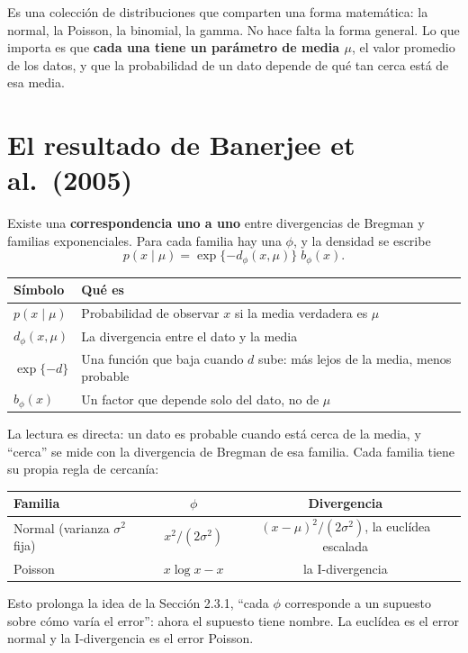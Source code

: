 \documentclass[11pt,a4paper]{article}
\begin{document}
Es una colección de distribuciones que comparten una forma matemática: la normal,
la Poisson, la binomial, la gamma. No hace falta la forma general. Lo que importa
es que \textbf{cada una tiene un parámetro de media $\mu$}, el valor promedio de
los datos, y que la probabilidad de un dato depende de qué tan cerca está de esa
media.

\section{El resultado de Banerjee et al.\ (2005)}

Existe una \textbf{correspondencia uno a uno} entre divergencias de Bregman y
familias exponenciales. Para cada familia hay una $\phi$, y la densidad se escribe
\[
  p(x\mid\mu)=\exp\{-d_\phi(x,\mu)\}\;b_\phi(x).
\]
\begin{center}
\renewcommand{\arraystretch}{1.3}
\begin{tabular}{@{}>{\raggedright\arraybackslash}p{3.2cm}>{\raggedright\arraybackslash}p{10.6cm}@{}}
\toprule
\textbf{Símbolo} & \textbf{Qué es} \\
\midrule
$p(x\mid\mu)$ & Probabilidad de observar $x$ si la media verdadera es $\mu$ \\
\midrule
$d_\phi(x,\mu)$ & La divergencia entre el dato y la media \\
\midrule
$\exp\{-d\}$ & Una función que baja cuando $d$ sube: más lejos de la media, menos probable \\
\midrule
$b_\phi(x)$ & Un factor que depende solo del dato, no de $\mu$ \\
\bottomrule
\end{tabular}
\end{center}
La lectura es directa: un dato es probable cuando está cerca de la media, y
``cerca'' se mide con la divergencia de Bregman de esa familia. Cada familia
tiene su propia regla de cercanía:
\begin{center}
\begin{tabular}{lcc}
\toprule
Familia & $\phi$ & Divergencia \\
\midrule
Normal (varianza $\sigma^2$ fija) & $x^2/(2\sigma^2)$ & $(x-\mu)^2/(2\sigma^2)$, la euclídea escalada \\
\midrule
Poisson & $x\log x-x$ & la I-divergencia \\
\bottomrule
\end{tabular}
\end{center}
Esto prolonga la idea de la Sección 2.3.1, ``cada $\phi$ corresponde a un supuesto
sobre cómo varía el error'': ahora el supuesto tiene nombre. La euclídea es el
error normal y la I-divergencia es el error Poisson.
\end{document}
